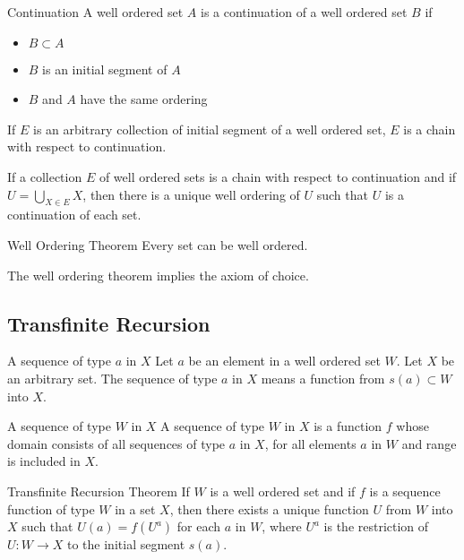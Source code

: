 \documentclass[a4paper]{article}
\begin{document}
\begin{defn}{Continuation}{} A well ordered set $A$ is a continuation of a well ordered set $B$ if
\begin{itemize}
\item $B\subset A$
\item $B$ is an initial segment of $A$
\item $B$ and $A$ have the same ordering
\end{itemize}
\end{defn}

\begin{thm}{}{} If $E$ is an arbitrary collection of initial segment of a well ordered set, $E$ is a chain with respect to continuation. 
\end{thm}

\begin{thm}{}{} If a collection $E$ of well ordered sets is a chain with respect to continuation and if $U=\bigcup_{X\in E}X$, then there is a unique well ordering of $U$ such that $U$ is a continuation of each set. 
\end{thm}

\begin{thm}{Well Ordering Theorem}{} Every set can be well ordered. 
\end{thm}

\begin{prp}{}{} The well ordering theorem implies the axiom of choice. 
\end{prp}

\subsection{Transfinite Recursion}
\begin{defn}{A sequence of type $a$ in $X$}{} Let $a$ be an element in a well ordered set $W$. Let $X$ be an arbitrary set. The sequence of type $a$ in $X$ means a function from $s(a)\subset W$ into $X$. 
\end{defn}

\begin{defn}{A sequence of type $W$ in $X$}{} A sequence of type $W$ in $X$ is a function $f$ whose domain consists of all sequences of type $a$ in $X$, for all elements $a$ in $W$ and range is included in $X$. 
\end{defn}

\begin{thm}{Transfinite Recursion Theorem}{} If $W$ is a well ordered set and if $f$ is a sequence function of type $W$ in a set $X$, then there exists a unique function $U$ from $W$ into $X$ such that $U(a)=f(U^a)$ for each $a$ in $W$, where $U^a$ is the restriction of $U:W\to X$ to the initial segment $s(a)$. 
\end{thm}
\end{document}
